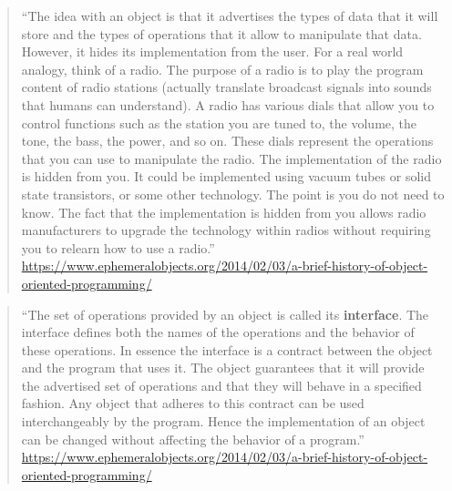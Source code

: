 \documentclass[]{tufte-book}
\begin{document}
\begin{quote}
``The idea with an object is that it advertises the types of data that it will store and the types of operations that it allow to manipulate that data. However, it hides its implementation from the user. For a real world analogy, think of a radio. The purpose of a radio is to play the program content of radio stations (actually translate broadcast signals into sounds that humans can understand). A radio has various dials that allow you to control functions such as the station you are tuned to, the volume, the tone, the bass, the power, and so on. These dials represent the operations that you can use to manipulate the radio. The implementation of the radio is hidden from you. It could be implemented using vacuum tubes or solid state transistors, or some other technology. The point is you do not need to know. The fact that the implementation is hidden from you allows radio manufacturers to upgrade the technology within radios without requiring you to relearn how to use a radio.''
\url{https://www.ephemeralobjects.org/2014/02/03/a-brief-history-of-object-oriented-programming/}
\end{quote}

\begin{quote}
``The set of operations provided by an object is called its \textbf{interface}. The
interface defines both the names of the operations and the behavior of these
operations. In essence the interface is a contract between the object and the
program that uses it. The object guarantees that it will provide the advertised
set of operations and that they will behave in a specified fashion. Any object
that adheres to this contract can be used interchangeably by the program. Hence
the implementation of an object can be changed without affecting the behavior of
a program.''
\url{https://www.ephemeralobjects.org/2014/02/03/a-brief-history-of-object-oriented-programming/}
\end{quote}
\end{document}
